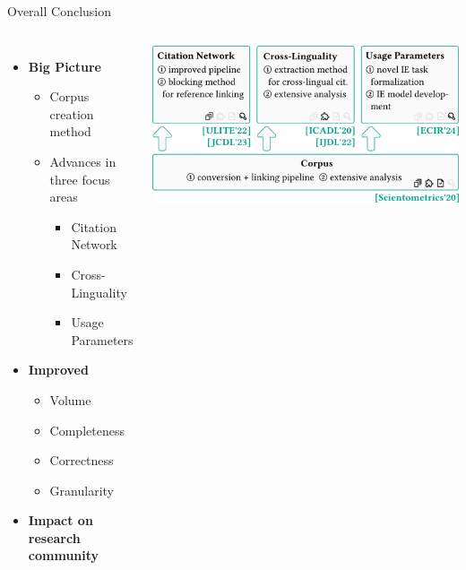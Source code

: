 \documentclass[en,16:9,smallfoot]{sdqbeamer}
\begin{document}
   \begin{frame}{Overall Conclusion}

   \begin{columns}
        \begin{itemize}
            \item \textbf{Big Picture}
            \begin{itemize}
                \item Corpus creation method
                \item Advances in three focus areas
                \begin{itemize}
                    \item Citation Network
                    \item Cross-Linguality
                    \item Usage Parameters
                \end{itemize}
            \end{itemize}
            \item \textbf{Improved}
            \begin{itemize}
                \item Volume
                \item Completeness
                \item Correctness
                \item Granularity
            \end{itemize}
            \item \textbf{Impact on research community}
        \end{itemize}
            \centering
            \includegraphics[width=\linewidth]{imgs/contrib_overview_v1}
   \end{columns}
   \end{frame}
\end{document}
